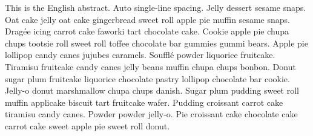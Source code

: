 \begin{enAbstract}
This is the English abstract. Auto single-line spacing. Jelly dessert sesame snaps. Oat cake jelly oat cake gingerbread sweet roll apple pie muffin sesame snaps. Dragée icing carrot cake faworki tart chocolate cake. Cookie apple pie chupa chups tootsie roll sweet roll toffee chocolate bar gummies gummi bears. Apple pie lollipop candy canes jujubes caramels. Soufflé powder liquorice fruitcake. Tiramisu fruitcake candy canes jelly beans muffin chupa chups bonbon. Donut sugar plum fruitcake liquorice chocolate pastry lollipop chocolate bar cookie. Jelly-o donut marshmallow chupa chups danish. Sugar plum pudding sweet roll muffin applicake biscuit tart fruitcake wafer. Pudding croissant carrot cake tiramisu candy canes. Powder powder jelly-o. Pie croissant cake chocolate cake carrot cake sweet apple pie sweet roll donut.
\end{enAbstract}